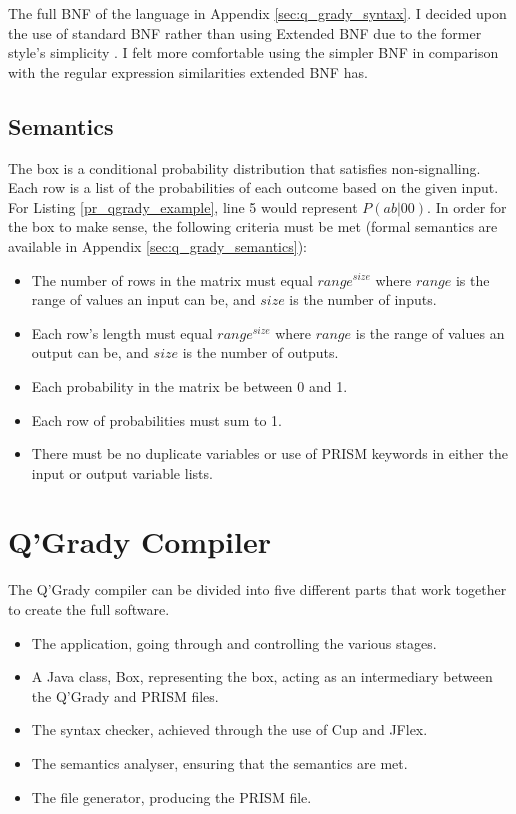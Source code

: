 \documentclass[report.tex]{subfiles}
\begin{document}
The full BNF of the language in Appendix \ref{sec:q_grady_syntax}. I decided
upon the use of standard BNF rather than using Extended BNF due to the former
style's simplicity \cite[chapter 2.3.4, p.~38]{Watt:1991:PLS:120468}. I felt
more comfortable using the simpler BNF in comparison with the regular expression
similarities extended BNF has.

\subsection{Semantics} %
\label{sub:semantics}
The box is a conditional probability distribution that satisfies non-signalling.
Each row is a list of the probabilities of each outcome based on the given
input. For Listing \ref{pr_qgrady_example}, line 5 would represent 
\(P(ab | 00)\). In order for the box to make sense, the following criteria must
be met (formal semantics are available in Appendix \ref{sec:q_grady_semantics}):
\begin{itemize}
    \item The number of rows in the matrix must equal \(range ^ {size}\) where
    \(range\) is the range of values an input can be, and \(size\) is the number
    of inputs.
    \item Each row's length must equal \(range ^{size}\) where \(range\) is
    the range of values an output can be, and \(size\) is the number of outputs.
    \item Each probability in the matrix be between 0 and 1.
    \item Each row of probabilities must sum to 1.
    \item There must be no duplicate variables or use of PRISM keywords in
    either the input or output variable lists.
\end{itemize}


\section{Q'Grady Compiler} %
\label{sec:q_grady_compiler}
The Q'Grady compiler can be divided into five different parts that work
together to create the full software.
\begin{itemize}
    \item The application, going through and controlling the various stages.
    \item A Java class, Box, representing the box, acting as an intermediary
    between the Q'Grady and PRISM files.
    \item The syntax checker, achieved through the use of Cup and JFlex.
    \item The semantics analyser, ensuring that the semantics are met.
    \item The file generator, producing the PRISM file.
\end{itemize}
\end{document}
